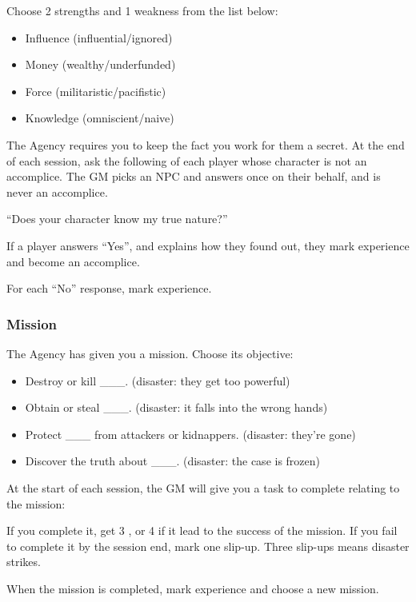 Choose 2 strengths and 1 weakness from the list below:
\begin{itemize}
\item Influence (influential\slash ignored)
\item Money (wealthy\slash underfunded)
\item Force (militaristic\slash pacifistic)
\item Knowledge (omniscient\slash naive)
\end{itemize}

The Agency requires you to keep the fact you work for them a secret. At the end of each session,
ask the following of each player whose character is not an accomplice.
The GM picks an NPC and answers once on their behalf, and is never an accomplice.

``Does your character know my true nature?''

If a player answers ``Yes'', and explains how they found out, they mark experience and become an accomplice.

For each ``No'' response, mark experience.

\subsubsection{Mission}\label{sec:Mission}
The Agency has given you a mission. Choose its objective:
\begin{itemize}
\item Destroy or kill \_\_\_. (disaster: they get too powerful)
\item Obtain or steal \_\_\_. (disaster: it falls into the wrong hands)
\item Protect \_\_\_ from attackers or kidnappers. (disaster: they're gone)
\item Discover the truth about \_\_\_. (disaster: the case is frozen)
\end{itemize}

At the start of each session, the GM will give you a task to complete relating to the mission:

If you complete it, get 3 \money , or 4 \money if it lead to the success of the mission. If you fail to complete it by the session end, mark one slip-up. Three slip-ups means disaster strikes.

When the mission is completed, mark experience and choose a new mission.


